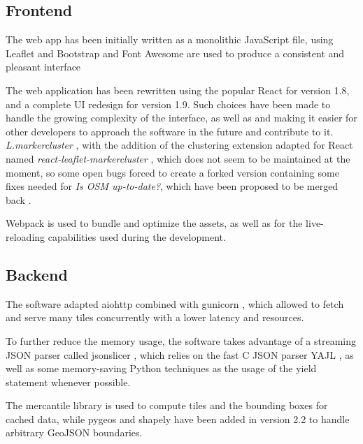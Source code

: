 \documentclass{Configuration_Files/PoliMi3i_thesis}
\begin{document}
\subsection{Frontend}

The web app has been initially written as a monolithic JavaScript file, using Leaflet \cite{LeafletLeaflet2022} and Bootstrap \cite{TwbsBootstrap2022} and Font Awesome \cite{FontAwesome} are used to produce a consistent and pleasant interface

The web application has been rewritten using the popular React \cite{React2022} for version 1.8, and a complete UI redesign for version 1.9. Such choices have been made to handle the growing complexity of the interface, as well as and making it easier for other developers to approach the software in the future and contribute to it.
\textit{L.markercluster} \cite{LeafletMarkercluster2022}, with the addition of the clustering extension adapted for React named \textit{react-leaflet-markercluster} \cite{uzhvaReactLeafletMarkercluster2022}, which does not seem to be maintained at the moment, so some open bugs forced to create a forked version containing some fixes needed for \textit{Is OSM up-to-date?}, which have been proposed to be merged back \cite{IssuesYuzhvaReactleafletmarkercluster}.

Webpack \cite{Webpack2022} is used to bundle and optimize the assets, as well as for the live-reloading capabilities used during the development.

\subsection{Backend}

The software adapted aiohttp \cite{AsyncHttpClient2022} combined with gunicorn \cite{GunicornPythonWSGI}, which allowed to fetch and serve many tiles concurrently with a lower latency and resources.

To further reduce the memory usage, the software takes advantage of a streaming JSON parser called jsonslicer \cite{marakasovJsonslicerStreamJSON2022}, which relies on the fast C JSON parser YAJL \cite{hilaielLloydYajl2022}, as well as some memory-saving Python techniques as the usage of the yield statement whenever possible.

The mercantile \cite{Mercantile2022} library is used to compute tiles and the bounding boxes for cached data, while pygeos and shapely have been added in version 2.2 to handle arbitrary GeoJSON boundaries.
\end{document}
